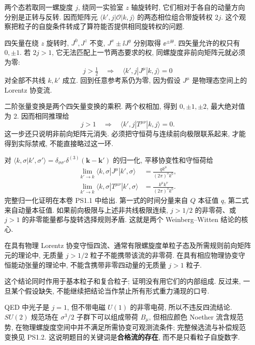 两个态若取同一螺旋度 $j$, 绕同一实验室 $z$ 轴旋转时, 它们相对于各自的动量方向分别是正转与反转. 因而矩阵元 $\langle k',j|\mathcal O|k,j\rangle$ 的两态相位组合带旋转权 $2j$. 这个观察把粒子的自旋条件转成了算符能否提供相同旋转权的问题.

四矢量在绕 $z$ 旋转时, $J^0,J^z$ 不变, $J^x\pm\ii J^y$ 分别取得 $\ee^{\pm\ii\theta}$. 四矢量允许的权只有 $0,\pm1$. 若 $2j>1$, 它无法匹配上一节两态要求的权, 同螺旋度非前向矩阵元就必须为零:
\[
j>\tfrac12\quad\Longrightarrow\quad
\langle k',j|J^\mu|k,j\rangle=0
\]
对全部不共线 $k,k'$ 成立. 回到任意参考系仍为零, 因为假设 $J^\mu$ 是物理态空间上的 Lorentz 协变流.

二阶张量变换是两个四矢量变换的乘积. 两个权相加, 得到 $0,\pm1,\pm2$, 最大绝对值为 2. 因而相同推理给
\[
j>1\quad\Longrightarrow\quad
\langle k',j|T^{\mu\nu}|k,j\rangle=0.
\]
这一步还只说明非前向矩阵元消失. 必须把守恒荷与连续前向极限联系起来, 才能得到实际禁戒, 不能直接略过这一环.

对 $\langle k,\sigma|k',\sigma'\rangle=\delta_{\sigma\sigma'}\delta^{(3)}(\mathbf k-\mathbf k')$ 的归一化, 平移协变性和守恒荷给
\begin{align*}
\lim_{k'\to k}\langle k,\sigma|J^\mu|k',\sigma\rangle
&=\frac{qk^\mu}{(2\pi)^3k^0},\\
\lim_{k'\to k}\langle k,\sigma|T^{\mu\nu}|k',\sigma\rangle
&=\frac{k^\mu k^\nu}{(2\pi)^3k^0}.
\end{align*}
完整归一化证明在本卷 PS1.1 中给出. 第一式的时间分量来自 $Q$ 本征值 $q$, 第二式来自动量本征值. 如果前向极限与上述非共线极限连续, $j>1/2$ 的非零荷、或 $j>1$ 的非零能量都与旋转选择规则矛盾. 这就是两个 Weinberg--Witten 结论的核心.

\begin{proposition}
在具有物理 Lorentz 协变守恒四流、通常有限螺旋度单粒子态及所需规则前向矩阵元的理论中, 无质量 $j>1/2$ 粒子不能携带该流的非零荷. 在具有相应物理协变守恒能动张量的理论中, 不能含携带非零四动量的无质量 $j>1$ 粒子.
\end{proposition}
这个结论同时作用于基本粒子和复合粒子; 证明没有用它们的内部组成. 反过来, 一旦某个假设缺失, 不能继续把结论当作禁止所有形式重力涌现的口号.

QED 中光子是 $j=1$, 但不带电磁 $U(1)$ 的非零电荷, 所以不违反四流结论. $SU(2)$ 规范场在 $\sigma^3/2$ 子群下可以组成带荷 $B_\mu$, 但相应颜色 Noether 流含规范势, 在物理螺旋度空间中并不满足所需协变可观测流条件; 完整候选流与补偿规范变换见 PS1.2. 这说明题目的关键词是\textbf{合格流的存在}, 而不是只看粒子自旋数字.

